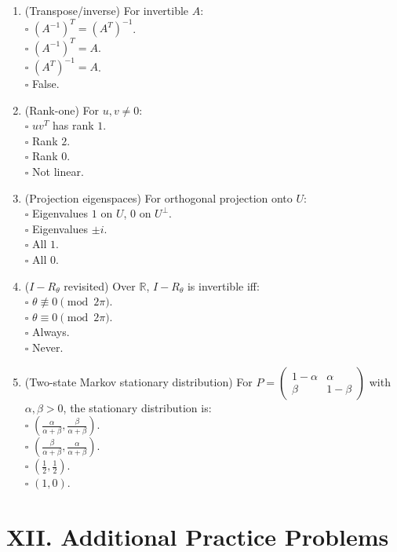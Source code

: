 \documentclass[11pt]{article}
\theoremstyle{upright}
\begin{document}
\begin{enumerate}
\item (Transpose/inverse) For invertible $A$:\\
\(\square\) $(A^{-1})^T=(A^T)^{-1}$.\\
\(\square\) $(A^{-1})^T=A$.\\
\(\square\) $(A^T)^{-1}=A$.\\
\(\square\) False.

\item (Rank-one) For $u,v\neq 0$:\\
\(\square\) $uv^T$ has rank $1$.\\
\(\square\) Rank $2$.\\
\(\square\) Rank $0$.\\
\(\square\) Not linear.

\item (Projection eigenspaces) For orthogonal projection onto $U$:\\
\(\square\) Eigenvalues $1$ on $U$, $0$ on $U^\perp$.\\
\(\square\) Eigenvalues $\pm i$.\\
\(\square\) All $1$.\\
\(\square\) All $0$.

\item ($I-R_\theta$ revisited) Over $\mathbb{R}$, $I-R_\theta$ is invertible iff:\\
\(\square\) $\theta\not\equiv 0\pmod{2\pi}$.\\
\(\square\) $\theta\equiv 0\pmod{2\pi}$.\\
\(\square\) Always.\\
\(\square\) Never.

\item (Two-state Markov stationary distribution) For
$P=\begin{pmatrix}1-\alpha&\alpha\\ \beta&1-\beta\end{pmatrix}$ with $\alpha,\beta>0$, the stationary distribution is:\\
\(\square\) $\left(\frac{\alpha}{\alpha+\beta},\frac{\beta}{\alpha+\beta}\right)$.\\
\(\square\) $\left(\frac{\beta}{\alpha+\beta},\frac{\alpha}{\alpha+\beta}\right)$.\\
\(\square\) $(\tfrac12,\tfrac12)$.\\
\(\square\) $(1,0)$.
\end{enumerate}
\section*{XII. Additional Practice Problems}
\end{document}
